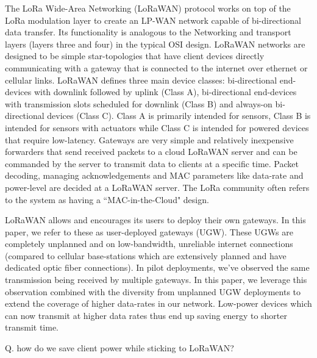 The LoRa Wide-Area Networking (LoRaWAN) protocol works on top of the LoRa
modulation layer to create an LP-WAN network capable of bi-directional data
transfer. Its functionality is analogous to the Networking and transport
layers (layers three and four) in the typical OSI design. LoRaWAN networks
are designed to be simple star-topologies that have client devices directly
communicating with a gateway that is connected to the internet over ethernet
or cellular links. LoRaWAN defines three main device classes: bi-directional
end-devices with downlink followed by uplink (Class A), bi-directional
end-devices with transmission slots scheduled for downlink (Class B) and
always-on bi-directional devices (Class C). Class A is primarily intended for
sensors, Class B is intended for sensors with actuators while Class C is
intended for powered devices that require low-latency. Gateways are very
simple and relatively inexpensive forwarders that send received packets to a
cloud LoRaWAN server and can be commanded by the server to transmit data to
clients at a specific time. Packet decoding, managing acknowledgements and
MAC parameters like data-rate and power-level are decided at a LoRaWAN
server. The LoRa community often refers to the system as having a
``MAC-in-the-Cloud" design.

LoRaWAN allows and encourages its users to deploy their own gateways. In this
paper, we refer to these as user-deployed gateways (UGW). These UGWs are
completely unplanned and on low-bandwidth, unreliable internet connections
(compared to cellular base-stations which are extensively planned and have
dedicated optic fiber connections). In pilot deployments, we've observed the
same transmission being received by multiple gateways. In this paper, we
leverage this observation combined with the diversity from unplanned UGW
deployments to extend the coverage of higher data-rates in our network.
Low-power devices which can now transmit at higher data rates thus end up
saving energy to shorter transmit time.

{\color{blue}

Q. how do we save client power while sticking to LoRaWAN?
}